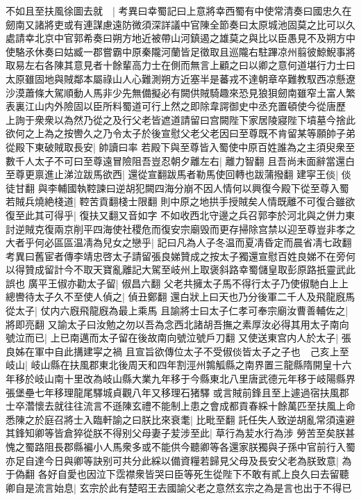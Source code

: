 不如且至扶風徐圖去就　|{
	考異曰幸蜀記曰上意將幸西蜀有中使常清奏曰國忠久在劒南又諸將吏或有連謀慮遠防微須深詳議中官陳全節奏曰太原城池固莫之比可以久處請幸北京中官郭希奏曰朔方地近被帶山河鎮遏之雄莫之與比以臣愚見不及朔方中使駱氶休奏曰姑臧一郡嘗霸中原秦隴河蘭皆足徵取且巡隴右駐蹕凉州翦彼鯨鯢事將取易左右各陳其意見者十餘輩高力士在側而無言上顧之曰以卿之意何道堪行力士曰太原雖固地與賊鄰本屬祿山人心難測朔方近塞半是蕃戎不達朝章卒難教馭西凉懸遼沙漠蕭條大駕順動人馬非少先無備擬必有闕供賊騎趣來恐見狼狽劒南雖窄土富人繁表裏江山内外險固以臣所料蜀道可行上然之即除韋諤御史中丞充置頓使今從唐歷}
上詢于衆衆以為然乃從之及行父老皆遮道請留曰宫闕陛下家居陵寢陛下墳墓今捨此欲何之上為之按轡久之乃令太子於後宣慰父老父老因曰至尊既不肯留某等願帥子弟從殿下東破賊取長安|{
	帥讀曰率}
若殿下與至尊皆入蜀使中原百姓誰為之主須臾衆至數千人太子不可曰至尊遠冒險阻吾豈忍朝夕離左右|{
	離力智翻}
且吾尚未面辭當還白至尊更禀進止涕泣跋馬欲西|{
	還從宣翻跋馬者勒馬使回轉也跋蒲撥翻}
建寜王倓|{
	倓徒甘翻}
與李輔國執鞚諫曰逆胡犯闕四海分崩不因人情何以興復今殿下從至尊入蜀若賊兵燒絶棧道|{
	鞚苦貢翻棧士限翻}
則中原之地拱手授賊矣人情既離不可復合雖欲復至此其可得乎|{
	復扶又翻又音如字}
不如收西北守邊之兵召郭李於河北與之併力東討逆賊克復兩京削平四海使社稷危而復安宗廟毁而更存掃除宫禁以迎至尊豈非孝之大者乎何必區區温凊為兒女之戀乎|{
	記曰凡為人子冬温而夏凊昏定而晨省凊七政翻　考異曰舊宦者傳李靖忠啓太子請留張良娣贊成之按太子獨還宣慰百姓良娣不在旁何以得贊成留計今不取天寶亂離記大駕至岐州上取褒斜路幸蜀儲皇取彭原路扺靈武此誤也}
廣平王俶亦勸太子留|{
	俶昌六翻}
父老共擁太子馬不得行太子乃使俶馳白上上總轡待太子久不至使人偵之|{
	偵丑鄭翻}
還白狀上曰天也乃分後軍二千人及飛龍廐馬從太子|{
	仗内六廐飛龍廐為最上乘馬}
且諭將士曰太子仁孝可奉宗廟汝曹善輔佐之|{
	將即亮翻}
又諭太子曰汝勉之勿以吾為念西北諸胡吾撫之素厚汝必得其用太子南向號泣而已|{
	上已南邁而太子留在後故南向號泣號戶刀翻}
又使送東宫内人於太子|{
	張良姊在軍中自此搆建寜之禍}
且宣旨欲傳位太子不受俶倓皆太子之子也　己亥上至岐山|{
	岐山縣在扶風郡東北後周天和四年割涇州鶉觚縣之南界置三龍縣隋開皇十六年移於岐山南十里改為岐山縣大業九年移于今縣東北八里唐武德元年移于岐陽縣界張堡壘七年移理龍尾驛城貞觀八年又移理石猪驛}
或言賊前鋒且至上遽過宿扶風郡士卒濳懷去就往往流言不遜陳玄禮不能制上患之會成都貢春綵十餘萬匹至扶風上命悉陳之於庭召將士入臨軒諭之曰朕比來衰耄|{
	比毗至翻}
託任失人致逆胡亂常須遠避其鋒知卿等皆倉猝從朕不得别父母妻子苃涉至此|{
	草行為苃水行為涉}
勞苦至矣朕甚愧之蜀路阻長郡縣褊小人馬衆多或不能供今聽卿等各還家朕獨與子孫中官前行入蜀亦足自達今日與卿等訣别可共分此綵以備資糧若歸見父母及長安父老為朕致意|{
	為于偽翻}
各好自愛也因泣下霑襟衆皆哭曰臣等死生從陛下不敢有貳上良久曰去留聽卿自是流言始息|{
	玄宗於此有楚昭王去國諭父老之意然玄宗之為是言也出于不得已}
